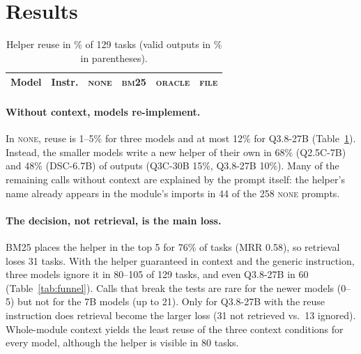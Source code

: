\documentclass[11pt]{article}
\begin{document}
\section{Results}
\label{sec:results}

\begin{table}[t]
\centering
\small
\setlength{\tabcolsep}{3.5pt}
\begin{tabular}{llcccc}
\toprule
Model & Instr. & \textsc{none} & \textsc{bm25} & \textsc{oracle} & \textsc{file} \\
\midrule

\end{tabular}
\caption{Helper reuse in \% of 129 tasks (valid outputs in \% in parentheses).}
\label{tab:main}
\end{table}

\begin{table}[t]
\centering
\small
\setlength{\tabcolsep}{3pt}
\caption{Reuse funnel over 129 tasks: not in context / ignored / broken / success.}
\label{tab:funnel}
\end{table}

\paragraph{Without context, models re-implement.}
In \textsc{none}, reuse is 1--5\% for three models and at most 12\% for Q3.8-27B (Table~\ref{tab:main}).
Instead, the smaller models write a new helper of their own in 68\% (Q2.5C-7B) and 48\% (DSC-6.7B)
of outputs (Q3C-30B 15\%, Q3.8-27B 10\%).
Many of the remaining calls without context are explained by the prompt itself: the helper's name already
appears in the module's imports in 44 of the 258 \textsc{none} prompts.

\paragraph{The decision, not retrieval, is the main loss.}
BM25 places the helper in the top 5 for 76\% of tasks (MRR 0.58), so retrieval loses 31 tasks.
With the helper guaranteed in context and the generic instruction, three models ignore it in 80--105
of 129 tasks, and even Q3.8-27B in 60 (Table~\ref{tab:funnel}). Calls that break the tests are rare
for the newer models (0--5) but not for the 7B models (up to 21).
Only for Q3.8-27B with the reuse instruction does retrieval become the larger loss (31 not retrieved vs.\ 13 ignored).
Whole-module context yields the least reuse of the three context conditions for every model,
although the helper is visible in 80 tasks.
\end{document}
